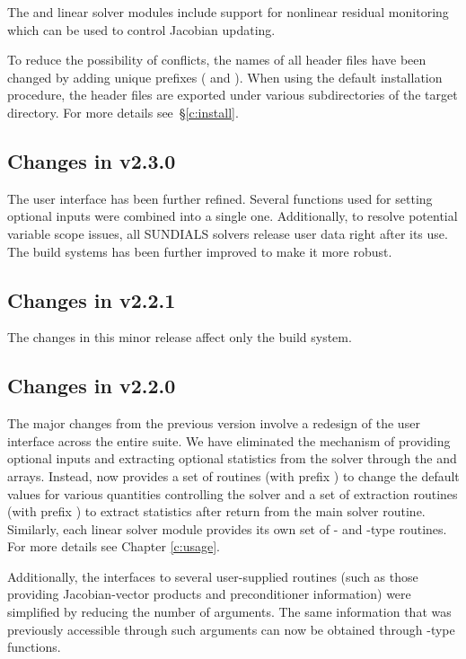 The {\kindense} and {\kinband} linear solver modules include support for
nonlinear residual monitoring which can be used to control Jacobian
updating.

To reduce the possibility of conflicts, the names of all header files have
been changed by adding unique prefixes ( and ).
When using the default installation procedure, the header files are exported
under various subdirectories of the target  directory. For more
details see~\S\ref{c:install}.

\subsection*{Changes in v2.3.0}

The user interface has been further refined. Several functions used for setting optional
inputs were combined into a single one. Additionally, to resolve potential variable scope
issues, all SUNDIALS solvers release user data right after its use. The build systems has 
been further improved to make it more robust.

\subsection*{Changes in v2.2.1}

The changes in this minor {\sundials} release affect only the build system.

\subsection*{Changes in v2.2.0}

The major changes from the previous version involve a redesign of
the user interface across the entire {\sundials} suite. We have
eliminated the mechanism of providing optional inputs and
extracting optional statistics from the solver through the
 and  arrays. Instead, {\kinsol} now provides a
set of routines (with prefix ) to change the default
values for various quantities controlling the solver and a set of
extraction routines (with prefix ) to extract
statistics after return from the main solver routine. Similarly,
each linear solver module provides its own set of {-} and
{-type} routines. For more details see Chapter \ref{c:usage}.

Additionally, the interfaces to several user-supplied routines
(such as those providing Jacobian-vector products and
preconditioner information) were simplified by reducing the number
of arguments. The same information that was previously accessible
through such arguments can now be obtained through {-type}
functions.

